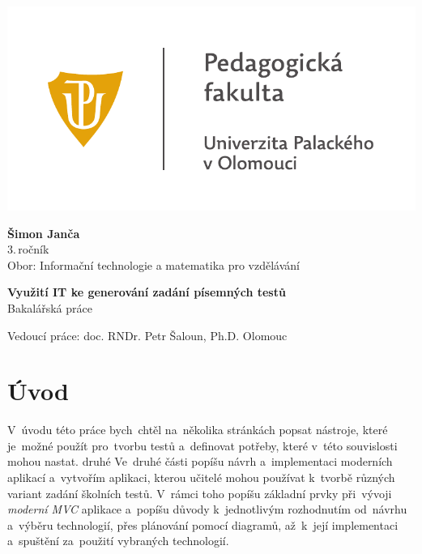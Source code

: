 \documentclass[10pt,a4paper]{article}
\begin{document}
	\begin{titlepage}
		\begin{center}
            {
            \centering
            \includegraphics[]{./img/UP_logo_PdF-UP_horizont_cz.pdf}
            }
			
			\vspace{3cm}

            {
                \LARGE
                \textbf{Šimon Janča}\\
                3.\,ročník\\[8mm]
                Obor: Informační technologie a matematika pro vzdělávání
            }

            \vspace{4cm}
			
			{
			    \textbf{\Huge Využití IT ke generování zadání písemných testů}\\[4mm]
			    \Large
			    Bakalářská práce
			}

            \vfill
            
            {
                Vedoucí práce:
                doc. RNDr. Petr Šaloun, Ph.D.
                \hfill
    			Olomouc \the\year{}
            }
			
		\end{center}
	\end{titlepage}
	\tableofcontents

	\newpage
    \clearpage
    \setcounter{page}{1}
	
	\section{Úvod}
    V~úvodu této práce bych~chtěl na~několika stránkách popsat nástroje, které je~možné použít pro~tvorbu testů a~definovat potřeby, které v~této souvislosti mohou nastat.
    druhé
    Ve~druhé části popíšu návrh a~implementaci moderních aplikací a~vytvořím aplikaci, kterou učitelé mohou používat k~tvorbě různých variant zadání školních testů. V~rámci toho popíšu základní prvky při~vývoji \emph{moderní \emph{MVC}} aplikace a~popíšu důvody k~jednotlivým rozhodnutím od~návrhu a~výběru technologií, přes plánování pomocí diagramů, až~k~její implementaci a~spuštění za~použití vybraných technologií.
    
\end{document}
